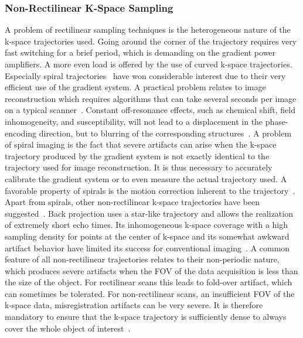 \subsubsection{Non-Rectilinear K-Space Sampling}
A problem of rectilinear sampling techniques is the heterogeneous nature of the k-space trajectories used. 
Going around the corner of the trajectory requires very fast switching for a brief period, which is demanding on the gradient power amplifiers.
A more even load is offered by the use of curved k-space trajectories. Especially spiral trajectories~\cite{SpiralMRI, SpiralMRI2} have won considerable interest due to their very efficient use of the gradient system. A practical problem relates to image reconstruction which requires algorithms that can take several seconds per image on a typical scanner~\cite{SamplingStrategies}. 
Constant off-resonance effects, such as chemical shift, field inhomogeneity, and susceptibility, will not lead to a displacement in the phase-encoding direction, but to blurring of the corresponding structures~\cite{SamplingStrategies}. A problem of spiral imaging is the fact that severe artifacts can arise when the k-space trajectory produced by the gradient system is not exactly identical to the trajectory used for image reconstruction. It is thus necessary to accurately calibrate the gradient system or to even measure the actual trajectory used. A favorable property of spirals is the motion correction inherent to the trajectory~\cite{SpiralMRI3}. Apart from spirals, other non-rectilinear k-space trajectories have been suggested~\cite{NonRectlinear1,NonRectlinear2}. Back projection uses a star-like trajectory and allows the realization of extremely short echo times. Its inhomogeneous k-space coverage with a high sampling density for points at the center of k-space and its somewhat awkward artifact behavior have limited its success for conventional imaging~\cite{SamplingStrategies}. %
A common feature of all non-rectilinear trajectories relates to their non-periodic nature, which produces severe artifacts when the FOV of the data acquisition is less than the size of the object. For rectilinear scans this leads to fold-over artifact, which can sometimes be tolerated. For non-rectilinear scans, an insufficient FOV of the k-space data, misregistration artifacts can be very severe. 
It is therefore mandatory to ensure that the k-space trajectory is sufficiently dense to always cover the whole object of interest~\cite{SamplingStrategies}. 

